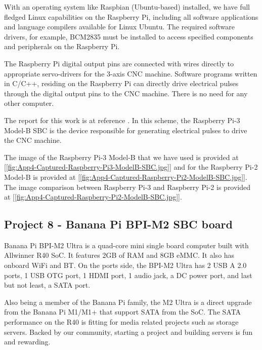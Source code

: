 With an operating system like Raspbian (Ubuntu-based) installed, we have full fledged Linux capabilities on the Raspberry Pi, including all software applications and language compilers available for Linux Ubuntu. The required software drivers, for example, BCM2835 must be installed to access specified components and peripherals on the Raspberry Pi.
\vspace*{1\baselineskip}

The Raspberry Pi digital output pins are connected with wires directly to appropriate servo-drivers for the 3-axis CNC machine. Software programs written in C/C++, residing on the Raspberry Pi can directly drive electrical pulses through the digital output pins to the CNC machine. There is no need for any other computer.
\vspace*{1\baselineskip}

The report for this work is at reference \cite{FYP_Asyrul_2017}. In this scheme, the Raspberry Pi-3 Model-B SBC is the device responsible for generating electrical pulses to drive the CNC machine. 
\vspace*{1\baselineskip}

The image of the  Raspberry Pi-3 Model-B that we have used is provided at [\ref{fig:App4-Captured-Raspberry-Pi3-ModelB-SBC.jpg}] and for the Raspberry Pi-2 Model-B is provided at [\ref{fig:App4-Captured-Raspberry-Pi2-ModelB-SBC.jpg}]. The image comparison between Raspberry Pi-3 and Raspberry Pi-2 is provided at [\ref{fig:App4-Captured-Raspberry-Pi2-ModelB-SBC.jpg}].

\subsection{Project 8 - Banana Pi BPI-M2 SBC board}

Banana Pi BPI-M2 Ultra is a quad-core mini single board computer built with Allwinner R40 SoC. It features 2GB of RAM and 8GB eMMC. It also has onboard WiFi and BT. On the ports side, the BPI-M2 Ultra has 2 USB A 2.0 ports, 1 USB OTG port, 1 HDMI port, 1 audio jack, a DC power port, and last but not least, a SATA port.
\vspace*{1\baselineskip}

Also being a member of the Banana Pi family, the M2 Ultra is a direct upgrade from the Banana Pi M1/M1+ that support SATA from the SoC. The SATA performance on the R40 is fitting for media related projects such as storage servers. Backed by our community, starting a project and building servers is fun and rewarding. 
\vspace*{1\baselineskip}

